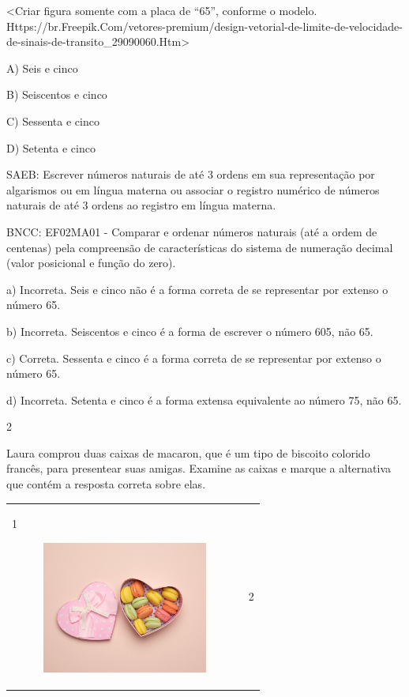 \begin{escolha}
\begin{escolha}
{{{{\textless{}Criar figura somente com a placa de ``65'', conforme o
modelo.
Https://br.Freepik.Com/vetores-premium/design-vetorial-de-limite-de-velocidade-de-sinais-de-transito\_29090060.Htm\textgreater{}

A) Seis e cinco

B) Seiscentos e cinco

C) Sessenta e cinco

D) Setenta e cinco

SAEB: Escrever números naturais de até 3 ordens em sua
representação por algarismos ou em língua materna ou associar o registro
numérico de números naturais de até 3 ordens ao registro em língua
materna.

BNCC: EF02MA01 - Comparar e ordenar números naturais (até a ordem de
centenas) pela compreensão de características do sistema de numeração
decimal (valor posicional e função do zero).

a) Incorreta. Seis e cinco não é a forma correta de se representar por
extenso o número 65.

b) Incorreta. Seiscentos e cinco é a forma de escrever o número 605, não 65.

c) Correta. Sessenta e cinco é a forma correta de se representar por
extenso o número 65.

d) Incorreta. Setenta e cinco é a forma extensa equivalente ao número 75, não 65.

\num{2}

Laura comprou duas caixas de macaron, que é um tipo de biscoito colorido
francês, para presentear suas amigas. Examine as caixas e marque a
alternativa que contém a resposta correta sobre elas.

\begin{longtable}[]{@{}ll@{}}
\toprule
\begin{minipage}[t]{0.48\columnwidth}\raggedright\strut
1

\includegraphics[width=2.97774in,height=1.70540in]{media/image163.png}\strut
\end{minipage} & \begin{minipage}[t]{0.48\columnwidth}\raggedright\strut
2


\end{minipage}
\end{longtable}}}}}
\end{escolha}
\end{escolha}
